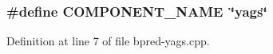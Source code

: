 \subsubsection[{COMPONENT\_\-NAME}]{\setlength{\rightskip}{0pt plus 5cm}\#define COMPONENT\_\-NAME~\char`\"{}yags\char`\"{}}\label{bpred-yags_8cpp_9146ade7ce24e3db226a973a59063892}




Definition at line 7 of file bpred-yags.cpp.